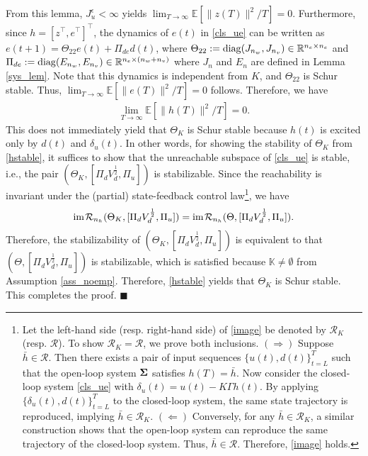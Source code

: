 \documentclass[preprint,5p,times,twocolumn]{elsarticle}
\newcommand{\bm}[1]{{\mbox{\boldmath $#1$}}}
\def\im{{\rm im} \hspace{0.3mm}}
\def\qed{\hfill $\blacksquare$}
\begin{document}
From this lemma, $J_u^{\epsilon} < \infty$ yields $\lim_{T \rightarrow \infty} \mathbb E[\|z(T)\|^2/T] = 0$. Furthermore, since $h = [z^{\top}, e^{\top}]^{\top}$, the dynamics of $e(t)$ in \eqref{cls_ue} can be written as $e(t+1) = \Theta_{22}e(t) + \Pi_{de}d(t)$, where $\Theta_{22} := {\rm diag}(J_{n_w},J_{n_v}) \in \mathbb R^{n_e \times n_e}$ and $\Pi_{de} := {\rm diag}(E_{n_w}, E_{n_v})\in \mathbb R^{n_e \times (n_w + n_v)}$ where $J_{n}$ and $E_n$ are defined in Lemma \ref{sys_lem}. Note that this dynamics is independent from $K$, and $\Theta_{22}$ is Schur stable. 
Thus, $\lim_{T \rightarrow \infty} \mathbb E[\|e(T)\|^2/T] = 0$ follows. Therefore, we have 
\begin{align}\label{hstable}
    \lim_{T \rightarrow \infty} \mathbb E[\|h(T)\|^2/T] = 0. 
\end{align}
This does not immediately yield that $\Theta_K$ is Schur stable because $h(t)$ is excited only by $d(t)$ and $\delta_u(t)$. In other words, for showing the stability of $\Theta_K$ from \eqref{hstable}, it suffices to show that the unreachable subspace of \eqref{cls_ue} is stable, i.e., the pair $(\Theta_K, [\Pi_dV_d^{\frac{1}{2}}, \Pi_u])$ is stabilizable. Since the reachability is invariant under the (partial) state-feedback control law\footnote{
Let the left-hand side (resp. right-hand side) of \eqref{image} be denoted by $\mathscr{R}_K$ (resp. $\mathscr{R}$). To show $\mathscr{R}_K = \mathscr{R}$, we prove both inclusions. $(\Rightarrow)$ Suppose $\bar{h} \in \mathscr{R}$. Then there exists a pair of input sequences $\{u(t), d(t)\}_{t=L}^T$ such that the open-loop system ${\bm \Sigma}$ satisfies $h(T) = \bar{h}$. Now consider the closed-loop system \eqref{cls_ue} with $\delta_u(t) = u(t) - K\Gamma h(t)$. By applying $\{\delta_u(t), d(t)\}_{t=L}^T$ to the closed-loop system, the same state trajectory is reproduced, implying $\bar{h} \in \mathscr{R}_K$. $(\Leftarrow)$ Conversely, for any $\bar{h} \in \mathscr{R}_K$, a similar construction shows that the open-loop system can reproduce the same trajectory of the closed-loop system. Thus, $\bar{h} \in \mathscr{R}$. Therefore, \eqref{image} holds.
}, we have
\begin{align}
    \im \mathcal R_{n_h}(\Theta_K, [\Pi_dV_d^{\frac{1}{2}}, \Pi_u]) = \im \mathcal R_{n_h}(\Theta, [\Pi_dV_d^{\frac{1}{2}}, \Pi_u]). \label{image}
\end{align}
Therefore, the stabilizability of $(\Theta_K, [\Pi_dV_d^{\frac{1}{2}}, \Pi_u])$ is equivalent to that $(\Theta, [\Pi_dV_d^{\frac{1}{2}}, \Pi_u])$ is stabilizable, which is satisfied because $\mathbb K \not=\emptyset$ from Assumption \ref{ass_noemp}. Therefore, \eqref{hstable} yields that $\Theta_K$ is Schur stable. This completes the proof. 
\qed
\end{document}
